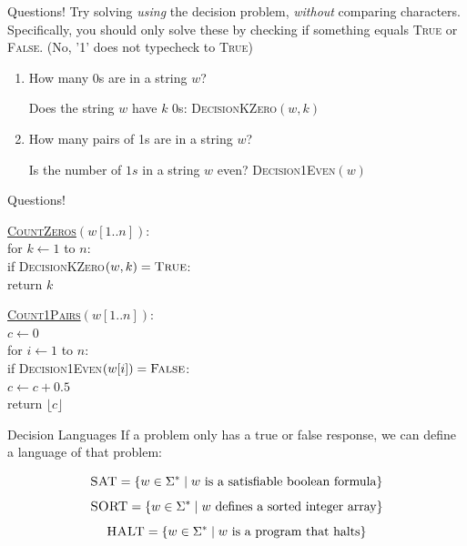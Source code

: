 \documentclass[aspectratio=169, handout]{beamer}
\begin{document}
\begin{frame}{Questions!}
Try solving \textit{using} the decision problem, \textit{without} comparing characters.
Specifically, you should only solve these by checking if something equals \textsc{True} or \textsc{False}. (No, '1' does not typecheck to \textsc{True})
\begin{enumerate}
    \item How many 0s are in a string $w$?
    
    Does the string $w$ have $k$ 0s: \textsc{DecisionKZero}$(w, k)$ 
    
    \item How many pairs of 1s are in a string $w$?
    
    Is the number of $1s$ in a string $w$ even?  \textsc{Decision1Even}$(w)$ 
\end{enumerate}
\end{frame}

\begin{frame}{Questions!}
    \begin{algo}
    \underline{\textsc{CountZeros}$(w[1..n])$}:\+
    \\ for $k \gets 1$ to $n$:\+
    \\    if \textsc{DecisionKZero}$(w,k) = \textsc{True}$:\+
    \\          return $k$
    \end{algo}
    
    \begin{algo}
    \underline{\textsc{Count1Pairs}$(w[1..n])$}:\+
    \\ $c \gets 0$
    \\ for $i \gets 1$ to $n$:\+
    \\    if \textsc{Decision1Even}$(w[i]) = \textsc{False}$:\+
    \\          $c \gets c + 0.5$\-\-
    \\  return $\lfloor c \rfloor$
    \end{algo}
\end{frame}


\begin{frame}{Decision Languages}
    If a problem only has a true or false response, we can define a language of that problem:
    
    $$\textsc{SAT} = \{w \in \Sigma^* \mid w \text{ is a satisfiable boolean formula}\}$$
    $$\textsc{SORT} = \{w \in \Sigma^* \mid w \text{ defines a sorted integer array}\}$$
    $$\textsc{HALT} =  \{w \in \Sigma^* \mid w \text{ is a program that halts}\}$$
\end{frame}
\end{document}
